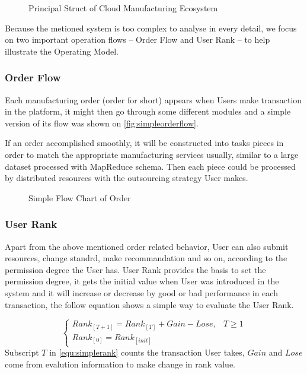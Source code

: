 \begin{figure}[!h]
\centering
\resizebox{0.9\textwidth}{!}{}
\caption{Principal Struct of Cloud Manufacturing Ecosystem}
\label{fig:platformstruct}
\end{figure}

Because the metioned system is too complex to analyse in every detail, we focus on two important operation flows -- Order Flow and User Rank -- to help illustrate the Operating Model. 

\subsubsection{Order Flow}
Each manufacturing order (order for short) appears when Users make transaction in the platform, it might then go through some different modules and a simple version of its flow was shown on \autoref{fig:simpleorderflow}.

If an order accomplished smoothly, it will be constructed into tasks pieces in order to match the appropriate manufacturing services usually, similar to a large dataset processed with MapReduce\cite{Dean2008} schema. Then each piece could be processed by distributed resources with the outsourcing strategy User makes.

\begin{figure}[!h]
\centering\small
\resizebox{0.9\textwidth}{!}{}
\caption{Simple Flow Chart of Order}
\label{fig:simpleorderflow}
\end{figure}
\subsubsection{User Rank}
Apart from the above mentioned order related behavior, User can also submit resources, change standrd, make recommandation and so on, according to the permission degree the User has. User Rank provides the basis to set the permission degree, it gets the initial value when User was introduced in the system and it will increase or decrease by good or bad performance in each transaction, the follow equation shows a simple way to evaluate the User Rank. 

\begin{equation}
  \begin{cases}
      Rank_{[T+1]} = Rank_{[T]} + Gain - Lose, & T \geqslant 1\\
      Rank_{[0]} = Rank_{[init]}
  \end{cases}
\label{equ:simplerank}
\end{equation}
Subscript $T$ in \eqref{equ:simplerank} counts the transaction User takes, $Gain$ and $Lose$ come from evalution information to make change in rank value. 

